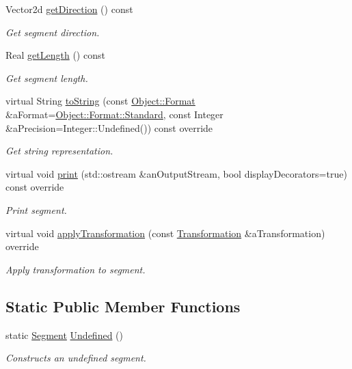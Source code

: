 \begin{DoxyCompactItemize}
Vector2d \hyperlink{classostk_1_1math_1_1geom_1_1d2_1_1objects_1_1_segment_a92754ce55fb91c186fbe06db876425f9}{get\+Direction} () const
\begin{DoxyCompactList}\small\item\em Get segment direction. \end{DoxyCompactList}\item 
Real \hyperlink{classostk_1_1math_1_1geom_1_1d2_1_1objects_1_1_segment_a9e6dcd2b0d921c755b6980f457ed7f3e}{get\+Length} () const
\begin{DoxyCompactList}\small\item\em Get segment length. \end{DoxyCompactList}\item 
virtual String \hyperlink{classostk_1_1math_1_1geom_1_1d2_1_1objects_1_1_segment_ac302430065e10f1f281bb8782a904673}{to\+String} (const \hyperlink{classostk_1_1math_1_1geom_1_1d2_1_1_object_aa76f9e30caebf4005bafbdff447f66cf}{Object\+::\+Format} \&a\+Format=\hyperlink{classostk_1_1math_1_1geom_1_1d2_1_1_object_aa76f9e30caebf4005bafbdff447f66cfaeb6d8ae6f20283755b339c0dc273988b}{Object\+::\+Format\+::\+Standard}, const Integer \&a\+Precision=Integer\+::\+Undefined()) const override
\begin{DoxyCompactList}\small\item\em Get string representation. \end{DoxyCompactList}\item 
virtual void \hyperlink{classostk_1_1math_1_1geom_1_1d2_1_1objects_1_1_segment_a475ba5efb353218779018b9be88be276}{print} (std\+::ostream \&an\+Output\+Stream, bool display\+Decorators=true) const override
\begin{DoxyCompactList}\small\item\em Print segment. \end{DoxyCompactList}\item 
virtual void \hyperlink{classostk_1_1math_1_1geom_1_1d2_1_1objects_1_1_segment_afbd5fe1b8136f738a0e93b934b290394}{apply\+Transformation} (const \hyperlink{classostk_1_1math_1_1geom_1_1d2_1_1_transformation}{Transformation} \&a\+Transformation) override
\begin{DoxyCompactList}\small\item\em Apply transformation to segment. \end{DoxyCompactList}\end{DoxyCompactItemize}
\subsection*{Static Public Member Functions}
\begin{DoxyCompactItemize}
\item 
static \hyperlink{classostk_1_1math_1_1geom_1_1d2_1_1objects_1_1_segment}{Segment} \hyperlink{classostk_1_1math_1_1geom_1_1d2_1_1objects_1_1_segment_a44d3a5817296d96bf82ebbc459055025}{Undefined} ()
\begin{DoxyCompactList}\small\item\em Constructs an undefined segment. \end{DoxyCompactList}\end{DoxyCompactItemize}
